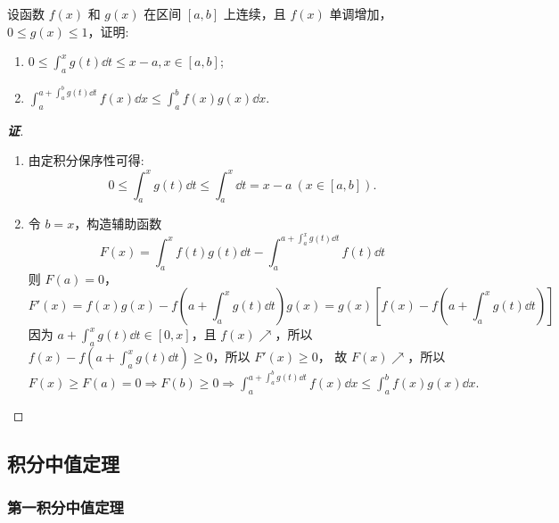 \begin{example}
    设函数 $ f(x) $ 和 $ g(x) $ 在区间 $ [a, b] $ 上连续，且 $ f(x) $ 单调增加，$  0 \leqslant g(x) \leqslant 1 $，证明:
    \begin{enumerate}[label=(\arabic{*})]
        \item $ \displaystyle 0 \leqslant \int_{a}^{x} g(t) \dd t \leqslant x-a, x \in[a, b] $;
        \item $ \displaystyle \int_{a}^{a+\int_{a}^{b} g(t) \dd t} f(x) \dd x \leqslant \int_{a}^{b} f(x) g(x) \dd x .$
    \end{enumerate}
\end{example}
\begin{proof}[{\songti \textbf{证}}]
    \begin{enumerate}[label=(\arabic{*})]
        \item 由定积分保序性可得:
              $$0\leqslant \int_{a}^{x}g(t)\dd t\leqslant \int_{a}^{x}\dd t=x-a~ (x\in[a,b]).$$
        \item 令 $b=x$，构造辅助函数
              $$F(x)=\int_{a}^{x}f(t)g(t)\dd t-\int_{a}^{a+\int_{a}^{x}g(t)\dd t}f(t)\dd t$$
              则 $\displaystyle F(a)=0$，
              $$F'(x)  =f(x)  g(x)  -f\left( a+\int _{a}^{x}g(t)  \dd t\right) g(x)  =g(x)  \left[ f(x)  -f\left( a+\int _{a}^{x}g(t)  \dd t\right) \right] $$
              因为 $\displaystyle a+\int _{a}^{x}g(t)  \dd t\in \left[ 0,x\right] $，且 $f(x)\nearrow$，所以 $\displaystyle f(x)  -f\left( a+\int _{a}^{x}g(t)  \dd t\right) \geqslant 0$，所以 $F'(x)\geqslant 0$，
              故 $F(x)\nearrow$，所以 $\displaystyle F(x)\geqslant F(a)=0\Rightarrow F(b)\geqslant 0\Rightarrow\int_{a}^{a+\int_{a}^{b} g(t) \dd t} f(x) \dd x \leqslant \int_{a}^{b} f(x) g(x) \dd x .$
    \end{enumerate}
\end{proof}

\subsection{积分中值定理}

\subsubsection{第一积分中值定理}

